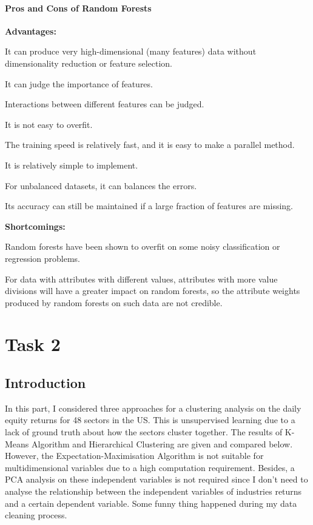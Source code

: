 \documentclass[11pt]{report}
\begin{document}
\subsubsection{Pros and Cons of Random Forests}

\textbf{Advantages:}

It can produce very high-dimensional (many features) data without dimensionality reduction or feature selection.

It can judge the importance of features.

Interactions between different features can be judged.

It is not easy to overfit.

The training speed is relatively fast, and it is easy to make a parallel method.

It is relatively simple to implement.

For unbalanced datasets, it can balances the errors.

Its accuracy can still be maintained if a large fraction of features are missing.

\textbf{Shortcomings:}

Random forests have been shown to overfit on some noisy classification or regression problems.

For data with attributes with different values, attributes with more value divisions will have a greater impact on random forests, so the attribute weights produced by random forests on such data are not credible.

\chapter{Task 2}
\section{Introduction}
In this part, I considered three approaches for a clustering analysis on the daily equity returns for 48 sectors in the US. This is unsupervised learning due to a lack of ground truth about how the sectors cluster together. The results of K-Means Algorithm and Hierarchical Clustering are given and compared below. However, the Expectation-Maximisation Algorithm is not suitable for multidimensional variables due to a high computation requirement. Besides, a PCA analysis on these independent variables is not required since I don't need to analyse the relationship between the independent variables of industries returns and a certain dependent variable. Some funny thing happened during my data cleaning process.
\end{document}
